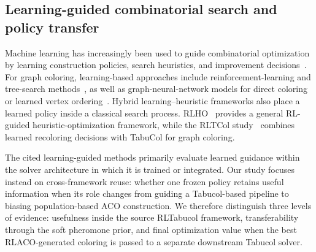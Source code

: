 \subsection{Learning-guided combinatorial search and policy transfer}

Machine learning has increasingly been used to guide combinatorial optimization by learning construction policies, search heuristics, and improvement decisions~\cite{bengio2021ml4co,darvariu2024graphrl}. For graph coloring, learning-based approaches include reinforcement-learning and tree-search methods~\cite{huang2019coloring,watkins2023dqn,yang2025mctscoloring}, as well as graph-neural-network models for direct coloring or learned vertex ordering~\cite{wang2024negative,langedal2024gnncoloring}. Hybrid learning--heuristic frameworks also place a learned policy inside a classical search process. RLHO~\cite{cai2019rlho} provides a general RL-guided heuristic-optimization framework, while the RLTCol study~\cite{frijters2023rltabucol} combines learned recoloring decisions with TabuCol for graph coloring.

The cited learning-guided methods primarily evaluate learned guidance within the solver architecture in which it is trained or integrated. Our study focuses instead on cross-framework reuse: whether one frozen policy retains useful information when its role changes from guiding a Tabucol-based pipeline to biasing population-based ACO construction. We therefore distinguish three levels of evidence: usefulness inside the source RLTabucol framework, transferability through the soft pheromone prior, and final optimization value when the best RLACO-generated coloring is passed to a separate downstream Tabucol solver.
